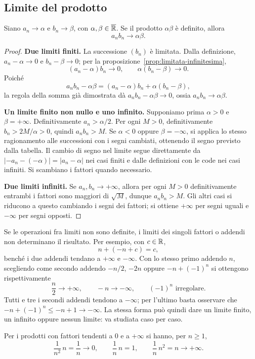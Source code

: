 \subsection{Limite del prodotto}

\begin{teorema}
Siano $a_n\to\alpha$ e $b_n\to\beta$, con $\alpha,\beta\in\overline{\mathbb{R}}$. Se il prodotto $\alpha\beta$ è definito, allora
\[
a_nb_n\longrightarrow\alpha\beta.
\]
\end{teorema}
\begin{proof}
\textbf{Due limiti finiti.} La successione $(b_n)$ è limitata. Dalla definizione, $a_n-\alpha\to0$ e $b_n-\beta\to0$; per la proposizione~\ref{prop:limitata-infinitesima},
\[
(a_n-\alpha)b_n\to0,\qquad \alpha(b_n-\beta)\to0.
\]
Poiché
\[
a_nb_n-\alpha\beta=(a_n-\alpha)b_n+\alpha(b_n-\beta),
\]
la regola della somma già dimostrata dà $a_nb_n-\alpha\beta\to0$, ossia $a_nb_n\to\alpha\beta$.

\textbf{Un limite finito non nullo e uno infinito.} Supponiamo prima $\alpha>0$ e $\beta=+\infty$. Definitivamente $a_n>\alpha/2$. Per ogni $M>0$, definitivamente $b_n>2M/\alpha>0$, quindi $a_nb_n>M$. Se $\alpha<0$ oppure $\beta=-\infty$, si applica lo stesso ragionamento alle successioni con i segni cambiati, ottenendo il segno previsto dalla tabella. Il cambio di segno nel limite segue direttamente da $|-a_n-(-\alpha)|=|a_n-\alpha|$ nei casi finiti e dalle definizioni con le code nei casi infiniti. Si scambiano i fattori quando necessario.

\textbf{Due limiti infiniti.} Se $a_n,b_n\to+\infty$, allora per ogni $M>0$ definitivamente entrambi i fattori sono maggiori di $\sqrt M$, dunque $a_nb_n>M$. Gli altri casi si riducono a questo cambiando i segni dei fattori; si ottiene $+\infty$ per segni uguali e $-\infty$ per segni opposti.
\end{proof}

\begin{osservazione}
Se le operazioni fra limiti non sono definite, i limiti dei singoli fattori o addendi non determinano il risultato. Per esempio, con $c\in\mathbb{R}$,
\[
n+(-n+c)=c,
\]
benché i due addendi tendano a $+\infty$ e $-\infty$.
Con lo stesso primo addendo $n$, scegliendo come secondo addendo $-n/2$, $-2n$ oppure $-n+(-1)^n$ si ottengono rispettivamente
\[
\frac n2\to+\infty,\qquad -n\to-\infty,\qquad
(-1)^n\text{ irregolare}.
\]
Tutti e tre i secondi addendi tendono a $-\infty$; per l'ultimo basta osservare che $-n+(-1)^n\le-n+1\to-\infty$. La stessa forma può quindi dare un limite finito, un infinito oppure nessun limite: va studiata caso per caso.

Per i prodotti con fattori tendenti a $0$ e a $+\infty$ si hanno, per $n\ge1$,
\[
\frac1{n^2}\,n=\frac1n\to0,\qquad
\frac1n\,n=1,\qquad
\frac1n\,n^2=n\to+\infty.
\]
\end{osservazione}

